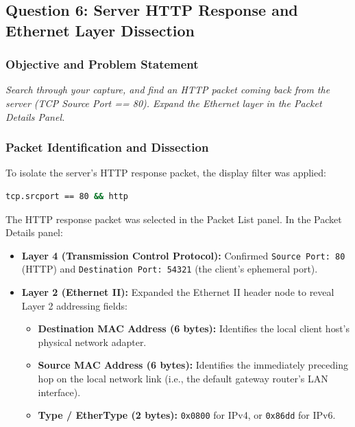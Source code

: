 \documentclass[12pt, a4paper]{article}
\begin{document}
\subsection{Question 6: Server HTTP Response and Ethernet Layer Dissection}

\subsubsection{Objective and Problem Statement}
\textit{Search through your capture, and find an HTTP packet coming back from the server (TCP Source Port == 80). Expand the Ethernet layer in the Packet Details Panel.}

\subsubsection{Packet Identification and Dissection}
To isolate the server's HTTP response packet, the display filter was applied:
\begin{lstlisting}[language=bash, caption=Wireshark Display Filter for Server HTTP Response]
tcp.srcport == 80 && http
\end{lstlisting}
The HTTP response packet was selected in the Packet List panel. In the Packet Details panel:
\begin{itemize}
    \item \textbf{Layer 4 (Transmission Control Protocol):} Confirmed \texttt{Source Port: 80} (HTTP) and \texttt{Destination Port: 54321} (the client's ephemeral port).
    \item \textbf{Layer 2 (Ethernet II):} Expanded the Ethernet II header node to reveal Layer 2 addressing fields:
    \begin{itemize}
        \item \textbf{Destination MAC Address (6 bytes):} Identifies the local client host's physical network adapter.
        \item \textbf{Source MAC Address (6 bytes):} Identifies the immediately preceding hop on the local network link (i.e., the default gateway router's LAN interface).
        \item \textbf{Type / EtherType (2 bytes):} \texttt{0x0800} for IPv4, or \texttt{0x86dd} for IPv6.
    \end{itemize}
\end{itemize}
\end{document}

